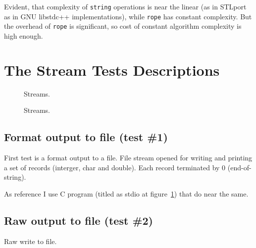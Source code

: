 \documentclass[a4paper]{article}
\providecommand{\STLport}{{\fontfamily{cmss}\selectfont STLport}}
\providecommand{\libstd}{{\fontfamily{cmtt}\selectfont GNU \mbox{libstdc++}}}
\begin{document}
Evident, that complexity of \texttt{string} operations is near the linear
(as in \STLport{} as in \libstd{} implementations),
while \texttt{rope} has constant complexity. But the overhead
of \texttt{rope} is significant, so cost of constant algorithm complexity
is high enough.


\section{The Stream Tests Descriptions\label{StreamTestsDescr}}

\begin{figure}
  \begin{center}
    
  \end{center}
  \caption{Streams.\label{streams}}
\end{figure}

\begin{figure}
  \begin{center}
    
  \end{center}
  \caption{Streams.\label{streamsOne}}
\end{figure}

\subsection{Format output to file\label{fstream-format} (test \#1)}

First test is a format output to a file. File stream opened for writing
and printing a set of records (interger, char and double). Each record
terminated by 0 (end-of-string).



As reference I use C program (titled as stdio at figure~\ref{streams}) that
do near the same.



\subsection{Raw output to file\label{fstream-raw} (test \#2)}

Raw write to file.


\end{document}
